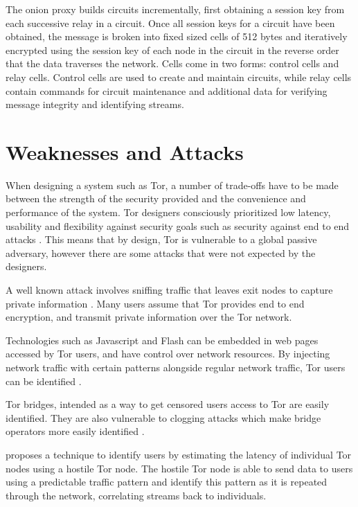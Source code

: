 \documentclass[conference]{IEEEtran}
\begin{document}
The onion proxy builds circuits incrementally, first obtaining a session key
from each successive relay in a circuit. Once all session keys for a circuit
have been obtained, the message is broken into fixed sized cells of 512 bytes
and iteratively encrypted using the session key of each node in the circuit in
the reverse order that the data traverses the network. Cells come in two forms:
control cells and relay cells. Control cells are used to create and maintain
circuits, while relay cells contain commands for circuit maintenance and
additional data for verifying message integrity and identifying streams.

\section{Weaknesses and Attacks}

When designing a system such as Tor, a number of trade-offs have to be made
between the strength of the security provided and the convenience and
performance of the system. Tor designers consciously prioritized low latency,
usability and flexibility against security goals such as security against end
to end attacks \parencite[4]{Dingledine:2004p314}. This means that by design,
Tor is vulnerable to a global passive adversary, however there are some attacks
that were not expected by the designers.

A well known attack involves sniffing traffic that leaves exit nodes to
capture private information \parencite{website:tor-password-leak}. Many users
assume that Tor provides end to end encryption, and transmit private information
over the Tor network.

Technologies such as Javascript and Flash can be embedded in web pages accessed
by Tor users, and have control over network resources. By injecting network
traffic with certain patterns alongside regular network traffic, Tor users can
be identified \parencite{Abbott:2007p298}.

Tor bridges, intended as a way to get censored users access to Tor are easily
identified. They are also vulnerable to clogging attacks which make bridge
operators more easily identified \parencite{McLachlan:2009p197}.

\textcite{Murdoch:2005p325} proposes a technique to identify users by estimating
the latency of individual Tor nodes using a hostile Tor node. The hostile Tor
node is able to send data to users using a predictable traffic pattern and
identify this pattern as it is repeated through the network, correlating streams
back to individuals.
\end{document}
